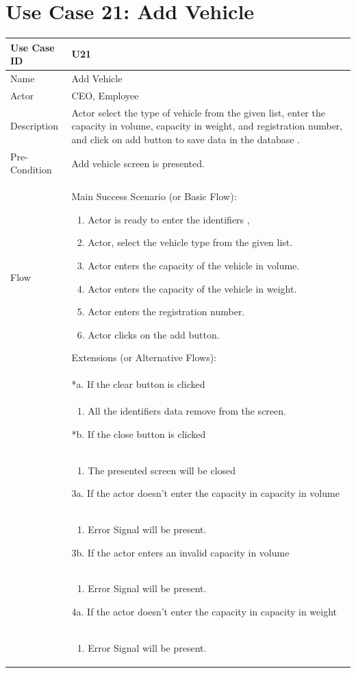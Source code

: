 \documentclass[12pt,a4paper]{report}
\begin{document}
\section{Use Case 21: Add Vehicle}
\begin{tabular}{ | m{3cm} | m{12cm}| } \hline
Use Case ID & U21   \\\hline
Name   &   Add Vehicle\\ \hline
Actor &  CEO, Employee  \\ \hline
Description & Actor select the type of vehicle from the given list, enter the capacity in volume, capacity in weight, and registration number, and click on add button to save data in the database .\\ \hline
Pre-Condition & Add vehicle screen is presented. \\\hline
Flow & Main Success Scenario (or Basic Flow):
\begin{enumerate}
\item Actor is ready to enter the identifiers
, \item Actor, select the vehicle type from the given list.   
\item Actor enters the capacity of the vehicle in volume.
\item Actor enters the capacity of the vehicle in weight.
\item Actor enters the registration number. 
\item Actor clicks on the add button.
\end{enumerate}
Extensions (or Alternative Flows):\\
& *a. If the clear button is clicked \\
& \begin{enumerate}
		\item All the identifiers data remove from the screen.
	\end{enumerate}
*b. If the close button is clicked\\
&	\begin{enumerate}
		\item The presented screen will be closed
	\end{enumerate}
3a. If the actor doesn't enter the capacity in capacity in volume\\ 	
&	\begin{enumerate}
		\item Error Signal will be present.
	\end{enumerate}
3b. If the actor enters an invalid capacity in volume \\ 	
&	\begin{enumerate}
		\item Error Signal will be present.
	\end{enumerate}
4a. If the actor doesn't enter the capacity in capacity in weight\\ 	
&	\begin{enumerate}
		\item Error Signal will be present.
	\end{enumerate}
\\\hline
\end{tabular}
\end{document}
